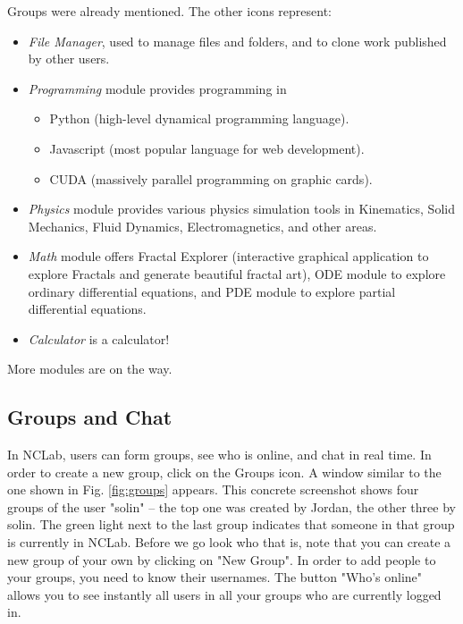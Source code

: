 \documentclass[article,A4,12pt]{llncs}
\begin{document}
\noindent
Groups were already mentioned. The other icons
represent:

\begin{itemize}
\item {\em File Manager}, used to manage files and folders, and to clone work published by other users.
\item {\em Programming} module provides programming in 
      \begin{itemize}
      \item Python (high-level dynamical programming language). 
      \item Javascript (most popular language for web development). 
      \item CUDA (massively parallel programming on graphic cards).
      \end{itemize}
\item {\em Physics} module provides various physics simulation tools in Kinematics,
      Solid Mechanics, Fluid Dynamics, Electromagnetics, and other areas. 
\item {\em Math} module offers Fractal Explorer (interactive graphical application 
      to explore Fractals and generate beautiful fractal art), ODE module to explore 
      ordinary differential equations, and PDE module to explore partial differential 
      equations. 
\item {\em Calculator} is a calculator! 
\end{itemize}
More modules are on the way. 

\subsection{Groups and Chat}

In NCLab, users can form groups, see who is online, and chat in real time. In order to 
create a new group, click on the Groups icon. A window similar to the one shown 
in Fig. \ref{fig:groups} appears. This concrete screenshot shows four groups of the 
user "solin" -- the top one was created by Jordan, the other three by solin. The 
green light next to the last group indicates that someone in that group
is currently in NCLab. Before we go look who that is, note that you can create a
new group of your own by clicking on "New Group". In order to add people to your groups,
you need to know their usernames. The button "Who's online" allows you to see instantly 
all users in all your groups who are currently logged in. 
\end{document}
